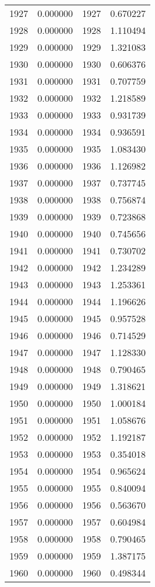 \documentclass[12pt]{article}
\begin{document}
\begin{longtable}{@{}cccc@{}}
1927 & 0.000000 & 1927 & 0.670227 \\
1928 & 0.000000 & 1928 & 1.110494 \\
1929 & 0.000000 & 1929 & 1.321083 \\
1930 & 0.000000 & 1930 & 0.606376 \\
1931 & 0.000000 & 1931 & 0.707759 \\
1932 & 0.000000 & 1932 & 1.218589 \\
1933 & 0.000000 & 1933 & 0.931739 \\
1934 & 0.000000 & 1934 & 0.936591 \\
1935 & 0.000000 & 1935 & 1.083430 \\
1936 & 0.000000 & 1936 & 1.126982 \\
1937 & 0.000000 & 1937 & 0.737745 \\
1938 & 0.000000 & 1938 & 0.756874 \\
1939 & 0.000000 & 1939 & 0.723868 \\
1940 & 0.000000 & 1940 & 0.745656 \\
1941 & 0.000000 & 1941 & 0.730702 \\
1942 & 0.000000 & 1942 & 1.234289 \\
1943 & 0.000000 & 1943 & 1.253361 \\
1944 & 0.000000 & 1944 & 1.196626 \\
1945 & 0.000000 & 1945 & 0.957528 \\
1946 & 0.000000 & 1946 & 0.714529 \\
1947 & 0.000000 & 1947 & 1.128330 \\
1948 & 0.000000 & 1948 & 0.790465 \\
1949 & 0.000000 & 1949 & 1.318621 \\
1950 & 0.000000 & 1950 & 1.000184 \\
1951 & 0.000000 & 1951 & 1.058676 \\
1952 & 0.000000 & 1952 & 1.192187 \\
1953 & 0.000000 & 1953 & 0.354018 \\
1954 & 0.000000 & 1954 & 0.965624 \\
1955 & 0.000000 & 1955 & 0.840094 \\
1956 & 0.000000 & 1956 & 0.563670 \\
1957 & 0.000000 & 1957 & 0.604984 \\
1958 & 0.000000 & 1958 & 0.790465 \\
1959 & 0.000000 & 1959 & 1.387175 \\
1960 & 0.000000 & 1960 & 0.498344 \\

\end{longtable}
\end{document}
